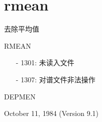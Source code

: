 \section{rmean}
\label{cmd:rmean}

去除平均值

RMEAN

\begin{itemize}
\item[-]1301: 未读入文件
\item[-]1307: 对谱文件非法操作
\end{itemize}

DEPMEN

October 11, 1984 (Version 9.1)
